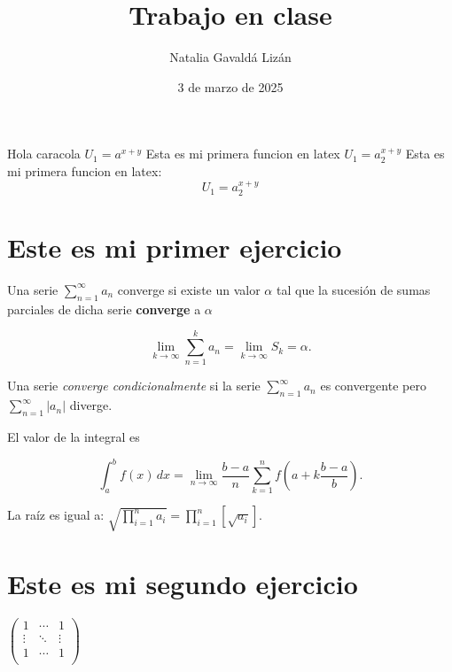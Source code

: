 \documentclass{article}
\title{Trabajo en clase}
\author{Natalia Gavaldá Lizán}
\date{3 de marzo de 2025}
\begin{document}
	
	\maketitle

	
	Hola caracola $\displaystyle U_1 = a^{x+y}$
	Esta es mi primera funcion en latex $U_1 = a^{x+y}_2$
	Esta es mi primera funcion en latex: 
		$$U_1 = a^{x+y}_2$$
	
	\section*{Este es mi primer ejercicio}
	
	Una serie $\sum_{n=1}^\infty a_n$ converge si existe un valor $\alpha$ tal que la sucesión de sumas parciales de dicha serie \textbf{converge} a $\alpha$
	
	\[
	\lim_{k \to \infty} \sum_{n=1}^{k} a_n = \lim_{k \to \infty} S_k = \alpha.
	\]
	
	Una serie \textit{converge condicionalmente} si la serie $\sum_{n=1}^\infty a_n$ es convergente pero $\displaystyle \sum_{n=1}^\infty |a_n|$ diverge.
	
	El valor de la integral es
	
	\[
	\int_a^b f(x)\, dx = \lim_{n \to \infty} \frac{b-a}{n} \sum_{k=1}^n f\left(a + k \frac{b-a}{b}\right).
	\]
	
	La raíz es igual a: $ \sqrt{\prod_{i=1}^n a_i} = 
	\displaystyle \prod_{i=1}^n \left[ \sqrt{a_i} \right].$
	
	\section*{Este es mi segundo ejercicio}
	
	$\left(
	\begin{array}{ccc}
		1 &  \cdots & 1 \\
		\vdots & \ddots  & \vdots \\
		1 & \cdots & 1 \\
	\end{array}
	\right)$
	
\end{document}
